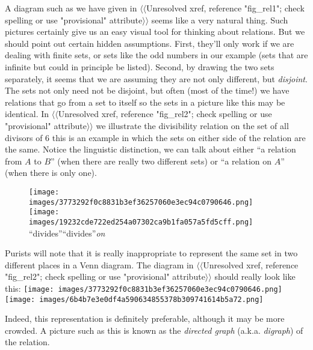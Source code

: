 \documentclass[10pt,]{book}
\theoremstyle{plain}
\theoremstyle{definition}
\theoremstyle{definition}
\numberwithin{equation}{section}
\begin{document}
    A diagram such as we have given in {$\langle\langle$Unresolved xref, reference "fig\_rel1"; check spelling or use "provisional" attribute$\rangle\rangle$} seems like a
    very natural thing. Such pictures certainly give us an easy visual
    tool for thinking
    about relations. But we should point out certain hidden assumptions.
    First, they'll only work if we are dealing with finite sets, or sets
    like the odd numbers in our example (sets that are infinite but could
    in principle be listed). Second, by drawing the two sets separately,
    it seems that we are assuming they are not only different, but
    \emph{disjoint}. The sets not only need not be disjoint, but often
    (most of the time!) we have relations that go from a set to itself
    so the sets in a picture like this may be identical. In {$\langle\langle$Unresolved xref, reference "fig\_rel2"; check spelling or use "provisional" attribute$\rangle\rangle$}
    we illustrate the divisibility relation on the set of all divisors of
    6 \textemdash{} this is an example in which the sets on either side of the relation
    are the same. Notice the linguistic distinction, we can talk about
    either ``a relation from \(A\) to \(B\)'' (when there are really two
    different sets) or ``a relation on \(A\)'' (when there is only one).
\leavevmode%
\begin{figure}
\centering
\texttt{[image: images/3773292f0c8831b3ef36257060e3ec94c0790646.png]}
\texttt{[image: images/19232cde722ed254a07302ca9b1fa057a5fd5cff.png]}
``divides''``divides''\emph{on}\end{figure}
\par

    Purists will note that it is really inappropriate to represent the same set
    in two different places in a Venn diagram. The diagram in {$\langle\langle$Unresolved xref, reference "fig\_rel2"; check spelling or use "provisional" attribute$\rangle\rangle$}
    should really look like this:
\texttt{[image: images/3773292f0c8831b3ef36257060e3ec94c0790646.png]}
\texttt{[image: images/6b4b7e3e0df4a590634855378b309741614b5a72.png]}
\par

    Indeed, this representation is definitely preferable, although it may be more crowded.
    A picture such as this is
    known as the \emph{directed graph} (a.k.a. \emph{digraph})
    of the relation.
\par
\end{document}
